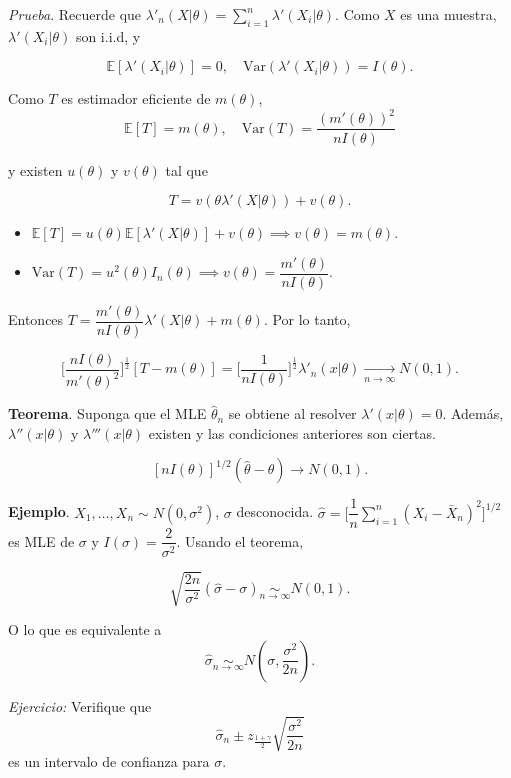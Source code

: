 \documentclass[
  12pt,
]{book}
\begin{document}
\emph{Prueba}. Recuerde que \(\lambda'_n(X|\theta) = \sum_{i=1}^n\lambda'(X_i|\theta)\). Como \(X\) es una muestra, \(\lambda'(X_i|\theta)\) son i.i.d, y

\[\mathbb E[\lambda'(X_i|\theta)] = 0, \quad \text{Var}(\lambda'(X_i|\theta)) = I(\theta).\]

Como \(T\) es estimador eficiente de \(m(\theta)\),
\[\mathbb E[T] = m(\theta), \quad \text{Var}(T) = \dfrac{(m'(\theta))^2}{nI(\theta)}\]

y existen \(u(\theta)\) y \(v(\theta)\) tal que

\[T = v(\theta \lambda'(X|\theta)) + v(\theta).\]

\begin{itemize}
\item
  \(\mathbb E [T]= u(\theta)\mathbb E[\lambda'(X|\theta)] + v(\theta) \implies v(\theta) = m(\theta)\).
\item
  \(\text{Var}(T) = u^2(\theta)I_n(\theta) \implies v(\theta) = \dfrac{m'(\theta)}{nI(\theta)}\).
\end{itemize}

Entonces \(T = \dfrac{m'(\theta)}{nI(\theta)}\lambda'(X|\theta) + m(\theta)\). Por lo tanto,

\[\bigg[\dfrac{nI(\theta)}{m'(\theta)^2}\bigg]^{\frac 12}[T-m(\theta)] = \bigg[\dfrac 1 {nI(\theta)}\bigg]^{\frac 12}\lambda'_n(x|\theta) \xrightarrow[n\to\infty]{} N(0,1).\]

\textbf{Teorema}. Suponga que el MLE \(\hat \theta_n\) se obtiene al resolver \(\lambda'(x|\theta) = 0\). Además, \(\lambda''(x|\theta)\) y \(\lambda'''(x|\theta)\) existen y las condiciones anteriores son ciertas.

\[[nI(\theta)]^{1/2}(\hat\theta-\theta) \to N(0,1).\]

\textbf{Ejemplo}. \(X_1,\dots, X_n \sim N(0,\sigma^2)\), \(\sigma\) desconocida. \(\hat\sigma = \bigg[\dfrac 1n \sum_{i=1}^{n}\left(X_{i}-\bar{X}_{n}\right)^{2}\bigg]^{1/2}\) es MLE de \(\sigma\) y \(I(\sigma) = \dfrac 2{\sigma^2}\).
Usando el teorema,

\[\sqrt{\dfrac{2n}{\sigma^2}} (\hat{\sigma} - \sigma) \underset{n\to\infty}{\sim} N\left(0,1\right).\]

O lo que es equivalente a \[\hat{\sigma} \underset{n\to\infty}{\sim}
N\left(\sigma,\dfrac{\sigma^2}{2n}\right).\]

\emph{Ejercicio:} Verifique que
\[ \hat\sigma_n\pm z_{\frac{1+\gamma}{2}}\sqrt{\dfrac{\sigma^2}{2n}}\] es un
intervalo de confianza para \(\sigma\).
\end{document}
